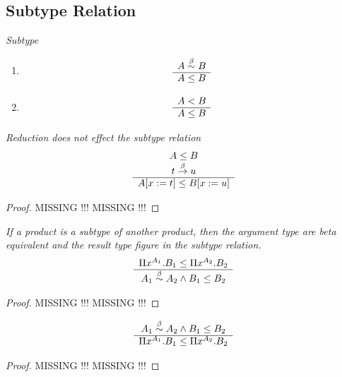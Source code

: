 \subsection{Subtype Relation}


\begin{definition}
    \emph{Subtype}
    \begin{enumerate}
    \item
        $$
        \begin{array}{c} 
            A \stackrel{\beta}{\sim} B
         \\ \hline 
            A \le B
        \end{array}
        $$

    \item
        $$
        \begin{array}{c} 
            A < B
         \\ \hline 
            A \le B
        \end{array}
        $$
    \end{enumerate}
\end{definition}



\begin{theorem}
    \label{SubtypeReduction}
    \emph{Reduction does not effect the subtype relation}
    $$
    \begin{array}{c} 
        A \le B
        \\
        t \stackrel{\beta}{\to} u
     \\ \hline 
        A[x:=t] \le B[x:=u]
    \end{array}
    $$

    \begin{proof}
        MISSING !!! MISSING !!!
    \end{proof}
\end{theorem}



\begin{theorem}
    \label{SubtypeProduct}
    \emph{If a product is a subtype of another product, then the argument type
    are beta equivalent and the result type figure in the subtype relation.}
    $$
    \begin{array}{c} 
        \Pi x^{A_1}. B_1 \le \Pi x^{A_2}. B_2
     \\ \hline 
        A_1 \stackrel{\beta}{\sim} A_2 \land B_1 \le B_2
    \end{array}
    $$

    \begin{proof}
        MISSING !!! MISSING !!!
    \end{proof}
\end{theorem}



\begin{theorem}
    \label{SubtypeProduct2}
    $$
    \begin{array}{c} 
        A_1 \stackrel{\beta}{\sim} A_2 \land B_1 \le B_2
     \\ \hline 
        \Pi x^{A_1}. B_1 \le \Pi x^{A_2}. B_2
    \end{array}
    $$

    \begin{proof}
        MISSING !!! MISSING !!!
    \end{proof}
\end{theorem}



